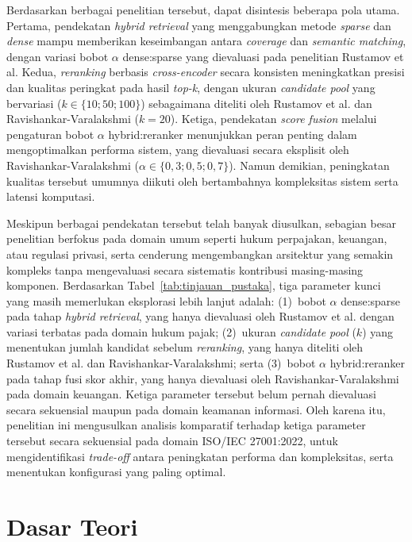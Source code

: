 Berdasarkan berbagai penelitian tersebut, dapat disintesis beberapa pola utama. Pertama, pendekatan \textit{hybrid retrieval} yang menggabungkan metode \textit{sparse} dan \textit{dense} mampu memberikan keseimbangan antara \textit{coverage} dan \textit{semantic matching}, dengan variasi bobot $\alpha$ dense:sparse yang dievaluasi pada penelitian Rustamov et al. Kedua, \textit{reranking} berbasis \textit{cross-encoder} secara konsisten meningkatkan presisi dan kualitas peringkat pada hasil \textit{top-k}, dengan ukuran \textit{candidate pool} yang bervariasi ($k \in \{10; 50; 100\}$) sebagaimana diteliti oleh Rustamov et al. dan Ravishankar-Varalakshmi ($k=20$). Ketiga, pendekatan \textit{score fusion} melalui pengaturan bobot $\alpha$ hybrid:reranker menunjukkan peran penting dalam mengoptimalkan performa sistem, yang dievaluasi secara eksplisit oleh Ravishankar-Varalakshmi ($\alpha \in \{0{,}3; 0{,}5; 0{,}7\}$). Namun demikian, peningkatan kualitas tersebut umumnya diikuti oleh bertambahnya kompleksitas sistem serta latensi komputasi.

Meskipun berbagai pendekatan tersebut telah banyak diusulkan, sebagian besar penelitian berfokus pada domain umum seperti hukum perpajakan, keuangan, atau regulasi privasi, serta cenderung mengembangkan arsitektur yang semakin kompleks tanpa mengevaluasi secara sistematis kontribusi masing-masing komponen. Berdasarkan Tabel~\ref{tab:tinjauan_pustaka}, tiga parameter kunci yang masih memerlukan eksplorasi lebih lanjut adalah: (1)~bobot $\alpha$ dense:sparse pada tahap \textit{hybrid retrieval}, yang hanya dievaluasi oleh Rustamov et al. dengan variasi terbatas pada domain hukum pajak; (2)~ukuran \textit{candidate pool} ($k$) yang menentukan jumlah kandidat sebelum \textit{reranking}, yang hanya diteliti oleh Rustamov et al. dan Ravishankar-Varalakshmi; serta (3)~bobot $\alpha$ hybrid:reranker pada tahap fusi skor akhir, yang hanya dievaluasi oleh Ravishankar-Varalakshmi pada domain keuangan. Ketiga parameter tersebut belum pernah dievaluasi secara sekuensial maupun pada domain keamanan informasi. Oleh karena itu, penelitian ini mengusulkan analisis komparatif terhadap ketiga parameter tersebut secara sekuensial pada domain ISO/IEC 27001:2022, untuk mengidentifikasi \textit{trade-off} antara peningkatan performa dan kompleksitas, serta menentukan konfigurasi yang paling optimal.

\section{Dasar Teori}


